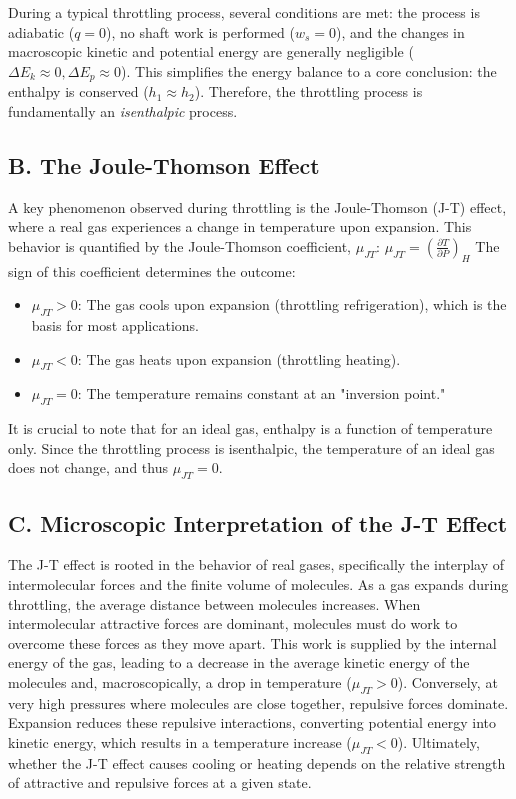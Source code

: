 \documentclass[aps,prl,reprint,groupedaddress]{revtex4-2}
\begin{document}
During a typical throttling process, several conditions are met: the process is adiabatic ($q=0$), no shaft work is performed ($w_s=0$), and the changes in macroscopic kinetic and potential energy are generally negligible ($\Delta E_k \approx 0, \Delta E_p \approx 0$). This simplifies the energy balance to a core conclusion: the enthalpy is conserved ($h_1 \approx h_2$). Therefore, the throttling process is fundamentally an \textit{isenthalpic} process.

\subsection{B. The Joule-Thomson Effect}
A key phenomenon observed during throttling is the Joule-Thomson (J-T) effect, where a real gas experiences a change in temperature upon expansion. This behavior is quantified by the Joule-Thomson coefficient, $\mu_{JT}$:
$\mu_{JT} = \left(\frac{\partial T}{\partial P}\right)_H$
The sign of this coefficient determines the outcome:
\begin{itemize}
    \item $\mu_{JT} > 0$: The gas cools upon expansion (throttling refrigeration), which is the basis for most applications.
    \item $\mu_{JT} < 0$: The gas heats upon expansion (throttling heating).
    \item $\mu_{JT} = 0$: The temperature remains constant at an "inversion point."
\end{itemize}
It is crucial to note that for an ideal gas, enthalpy is a function of temperature only. Since the throttling process is isenthalpic, the temperature of an ideal gas does not change, and thus $\mu_{JT} = 0$.

\subsection{C. Microscopic Interpretation of the J-T Effect}
The J-T effect is rooted in the behavior of real gases, specifically the interplay of intermolecular forces and the finite volume of molecules. As a gas expands during throttling, the average distance between molecules increases.
When intermolecular attractive forces are dominant, molecules must do work to overcome these forces as they move apart. This work is supplied by the internal energy of the gas, leading to a decrease in the average kinetic energy of the molecules and, macroscopically, a drop in temperature ($\mu_{JT}>0$).
Conversely, at very high pressures where molecules are close together, repulsive forces dominate. Expansion reduces these repulsive interactions, converting potential energy into kinetic energy, which results in a temperature increase ($\mu_{JT}<0$).
Ultimately, whether the J-T effect causes cooling or heating depends on the relative strength of attractive and repulsive forces at a given state.
\end{document}
